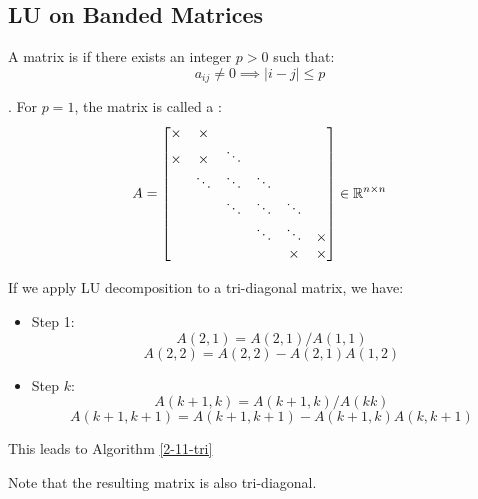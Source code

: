 \documentclass[../main/main.tex]{subfiles}
\begin{document}
\subsection{LU on Banded Matrices}
\begin{definition}
  A matrix is   if there exists an integer $p> 0$ such that: \[
    a_{ij}\neq 0 \implies |i-j| \leq p
  \]
\end{definition}
\begin{example}.
  For $p=1$, the matrix is called a : \[
A = \begin{bmatrix}
  \times &\times &&&& \\
  \times & \times & \ddots &&& \\
  & \ddots & \ddots & \ddots && \\
  &&\ddots & \ddots & \ddots & \\
  &&&\ddots & \ddots & \times \\
  &&& & \times& \times\\
\end{bmatrix} \in\mathbb{R}^{n\times n}
  \]
\end{example}
If we apply LU decomposition to a tri-diagonal matrix, we have:
\begin{itemize}
  \item  Step 1: \[
A(2,1)=A(2,1) / A(1,1)
        \] \[
A(2,2) = A(2,2) - A(2,1) A(1,2)
        \]
  \item  Step $k$: \[
A(k+1,k)=A(k+1,k) / A(k k)
        \] \[
        A(k+1,k+1) = A(k+1,k+1) - A(k+1,k)A(k,k+1)
        \]
\end{itemize}
This leads to Algorithm \ref{2-11-tri}

\begin{remark}
Note that the resulting matrix is also tri-diagonal.
\end{remark}
\end{document}

